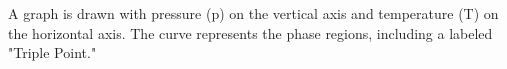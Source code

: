 A graph is drawn with pressure (p) on the vertical axis and temperature (T) on the horizontal axis. The curve represents the phase regions, including a labeled "Triple Point."